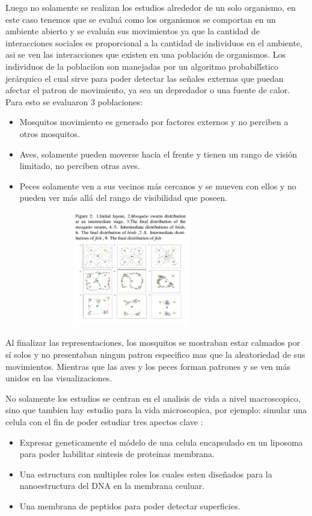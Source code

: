 \documentclass[conference]{IEEEtran}
\begin{document}
Luego no solamente se realizan los estudios alrededor de un solo organismo, en este caso tenemos que se evalu\'a como los organismos se comportan en un ambiente abierto y se evalu\'an sus movimientos ya que la cantidad de interacciones sociales es proporcional a la cantidad de individuos en el ambiente, asi se ven las interacciones que existen en una poblaci\'on de organismos. \cite{ASTK01, PMLC01}
Los individuos de la poblaci\'ion son manejadas por un algoritmo probabil\'ístico jer\'arquico el cual sirve para poder detectar las se\~nales externas que puedan afectar el patron de movimiento, ya sea un depredador o una fuente de calor. 
Para esto se evaluaron 3 poblaciones:
\begin{itemize}
\item Mosquitos movimiento es generado por factores externos y no perciben a otros mosquitos.
\item Aves, solamente pueden moverse hacia el frente y tienen un rango de visi\'on limitado, no perciben otras aves.
\item Peces solamente ven a sus vecinos m\'as cercanos y se mueven con ellos y no pueden ver m\'as all\'a del rango de visibilidad que poseen.
\end{itemize}

\begin{figure}[ht]
  \includegraphics[width=9cm,height=5cm]{img/mosquitos.jpg}
  \caption{\cite{TMRT01}}
  \label{fig:mosquitos}
\end{figure}

Al finalizar las representaciones, los mosquitos se mostraban estar calmados por s\'i solos y no presentaban ningun patron especifico mas que la aleatoriedad de sus movimientos. Mientras que las aves y los peces forman patrones y se ven m\'as unidos en las visualizaciones. \cite{ASTK01}

No solamente los estudios se centran en el analisis de vida a nivel macroscopico, sino que tambien hay estudio para la vida microscopica, por ejemplo: simular una celula con el fin de poder estudiar tres apectos clave
\cite{shinji01} :
\begin{itemize}
\item Expresar geneticamente el m\'odelo de una celula encapsulado en un liposoma para poder habilitar sintesis de proteinas membrana. 
\item Una estructura con multiples roles los cuales esten dise\~nados para la nanoestructura del DNA en la membrana ceuluar. 
\item Una membrana de peptidos para poder detectar superficies.
\end{itemize}
\end{document}
